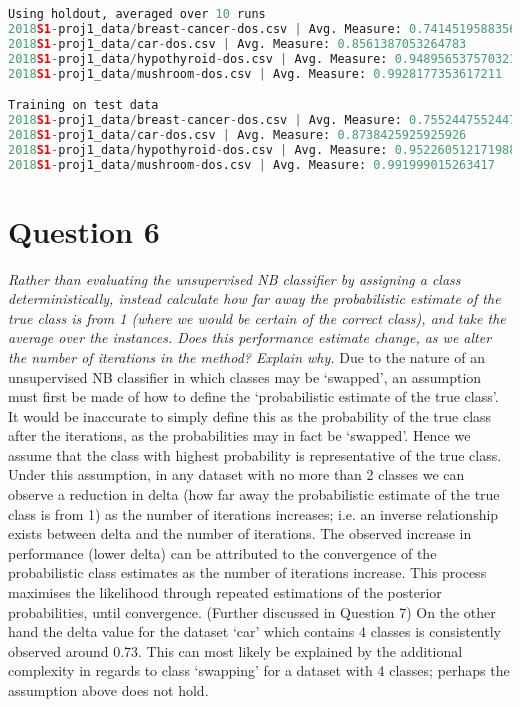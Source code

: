 \documentclass[a4paper]{article}
\begin{document}
\begin{lstlisting}[language=Python]
Using holdout, averaged over 10 runs
2018S1-proj1_data/breast-cancer-dos.csv | Avg. Measure: 0.7414519588356774
2018S1-proj1_data/car-dos.csv | Avg. Measure: 0.8561387053264783
2018S1-proj1_data/hypothyroid-dos.csv | Avg. Measure: 0.9489565375703217
2018S1-proj1_data/mushroom-dos.csv | Avg. Measure: 0.9928177353617211

Training on test data
2018S1-proj1_data/breast-cancer-dos.csv | Avg. Measure: 0.7552447552447551
2018S1-proj1_data/car-dos.csv | Avg. Measure: 0.8738425925925926
2018S1-proj1_data/hypothyroid-dos.csv | Avg. Measure: 0.9522605121719886
2018S1-proj1_data/mushroom-dos.csv | Avg. Measure: 0.991999015263417
\end{lstlisting}

\newpage
\section*{Question 6}
\textit{Rather than evaluating the unsupervised NB classifier by assigning a class deterministically, instead calculate how far away the probabilistic estimate of the true class is from 1 (where we would be certain of the correct class), and take the average over the instances. Does this performance estimate change, as we alter the number of iterations in the method? Explain why.}
\newline
\newline
Due to the nature of an unsupervised NB classifier in which classes may be ‘swapped’, an assumption must first be made of how to define the ‘probabilistic estimate of the true class’. It would be inaccurate to simply define this as the probability of the true class after the iterations, as the probabilities may in fact be ‘swapped’. Hence we assume that the class with highest probability is representative of the true class.
\newline
\newline
Under this assumption, in any dataset with no more than 2 classes we can observe a reduction in delta (how far away the probabilistic estimate of the true class is from 1) as the number of iterations increases; i.e. an inverse relationship exists between delta and the number of iterations. The observed increase in performance (lower delta) can be attributed to the convergence of the probabilistic class estimates as the number of iterations increase. This process maximises the likelihood through repeated estimations of the posterior probabilities, until convergence. (Further discussed in Question 7)
\newline
\newline
On the other hand the delta value for the dataset ‘car’ which contains 4 classes is consistently observed around 0.73. This can most likely be explained by the additional complexity in regards to class ‘swapping’ for a dataset with 4 classes; perhaps the assumption above does not hold.
\end{document}
